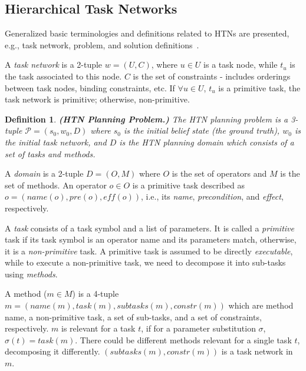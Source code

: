 \documentclass[letterpaper]{article} %
\newtheorem{definition}{Definition}
\begin{document}

\subsection{Hierarchical Task Networks}
Generalized basic terminologies and definitions related to HTNs are presented, e.g., task network, problem, and solution definitions~\cite{naubooks0014222}.  

A \textit{task network} is a 2-tuple $w=(U,C)$, where $u\in U$ is a task node, while $t_u$ is the task associated to this node. $C$ is the set of constraints - includes orderings between task nodes, binding constraints, etc. If $\forall u \in U$, $t_u$ is a primitive task, the task network is primitive; otherwise, non-primitive.

\begin{definition}
\textbf{(HTN Planning Problem.)} 
The HTN planning
problem is a 3-tuple $\mathcal{P} = (s_0, w_0, D)$ where $s_0$ is the initial belief state (the ground truth), $w_0$ is the initial task network, and $D$ is the HTN planning domain which consists of a set of tasks and methods.
\end{definition}
A \textit{domain} is a 2-tuple $D=(O, M)$ where $O$ is the set of operators and $M$ is the set of methods. 
An operator $o \in O$ is a primitive task described as $o=(name(o), pre(o), \textit{eff}(o))$, i.e., its \textit{name}, \textit{precondition}, and \textit{effect}, respectively. 

A \textit{task} consists of a task symbol and a list of parameters. It is called a \textit{primitive} task if its task symbol is an operator name and its parameters match, otherwise, it is a \textit{non-primitive} task. A primitive task is assumed to be directly \textit{executable}, while to execute a non-primitive task, we need to decompose it into sub-tasks using \textit{methods}. 

A method ($m \in M$) is a 4-tuple $m=(name(m),task(m),subtasks(m),constr(m))$ which are method name, a non-primitive task, a set of sub-tasks, and a set of constraints, respectively. $m$ is relevant for a task $t$, if for a parameter substitution $\sigma$, $\sigma(t) = task(m)$. There could be different methods relevant for a single task $t$, decomposing it differently. $(subtasks(m),constr(m))$ is a task network in $m$.      
\end{document}
